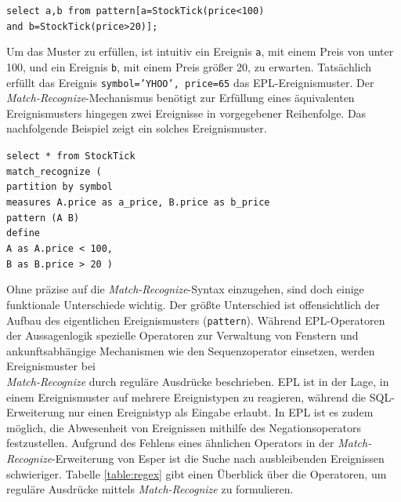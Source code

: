 \documentclass{acm_proc_article-sp}
\begin{document}
\texttt{select a,b from pattern[a=StockTick(price<100)\\
    and b=StockTick(price>20)];}

Um das Muster zu erfüllen, ist intuitiv ein Ereignis \texttt{a}, mit einem Preis von 
unter 
100, und ein Ereignis \texttt{b}, mit einem Preis größer 20, zu erwarten. Tatsächlich 
erfüllt das Ereignis \texttt{{symbol='YHOO', price=65}} das EPL-Ereignismuster. Der 
\emph{Match-Recognize}-Mechanismus benötigt zur Erfüllung eines äquivalenten 
Ereignismusters hingegen zwei Ereignisse in vorgegebener Reihenfolge. Das nachfolgende 
Beispiel zeigt ein solches Ereignismuster.

\texttt{select * from StockTick\\
match\_recognize (\\
partition by symbol\\
measures A.price as a\_price, B.price as b\_price\\
pattern (A B)\\
define \\
A as A.price < 100,\\
B as B.price > 20 )
}

Ohne präzise auf die \emph{Match-Recognize}-Syntax einzugehen, sind doch einige 
funktionale Unterschiede wichtig. Der größte Unterschied ist offensichtlich der Aufbau 
des eigentlichen Ereignismusters (\texttt{pattern}). Während EPL-Operatoren der 
Aussagenlogik spezielle Operatoren zur Verwaltung von Fenstern und 
ankunftsabhängige Mechanismen wie den Sequenzoperator einsetzen, werden Ereignismuster 
bei\\ 
\emph{Match-Recognize} durch reguläre Ausdrücke beschrieben. EPL ist in der Lage, in 
einem 
Ereignismuster auf mehrere Ereignistypen zu reagieren, während die SQL-Erweiterung nur 
einen Ereignistyp als Eingabe erlaubt. In EPL ist es zudem möglich, die Abwesenheit von 
Ereignissen mithilfe des Negationsoperators festzustellen. Aufgrund des Fehlens 
eines ähnlichen Operators in der \emph{Match-Recognize}-Erweiterung von Esper ist die 
Suche nach ausbleibenden Ereignissen schwieriger. Tabelle \ref{table:regex} gibt einen 
Überblick über die Operatoren, um reguläre Ausdrücke mittels \emph{Match-Recognize} 
zu formulieren.
\end{document}
